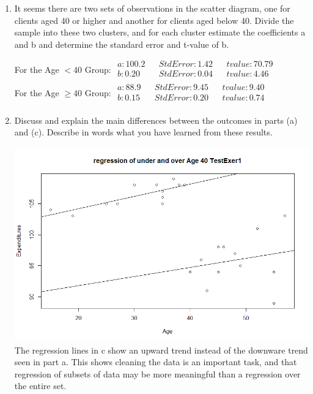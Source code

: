 \documentclass{article}
\begin{document}
\begin{enumerate}
\begin{enumerate}
		\item It seems there are two sets of observations in the scatter diagram, one for clients aged 40 or higher and
another for clients aged below 40. Divide the sample into these two clusters, and for each cluster estimate the
coefficients a and b and determine the standard error and t-value of b. \\
		\begin{center}
			For the Age $< 40$ Group:
			$\begin{matrix}
			a: 100.2 && Std Error: 1.42 && tvalue: 70.79 \\
			b: 0.20 && Std Error: 0.04 && tvalue: 4.46  \\
			\end{matrix}$
			\\
			For the Age $\geq 40$ Group:
			$\begin{matrix}
			a: 88.9 && Std Error: 9.45 && tvalue: 9.40 \\
			b: 0.15 && Std Error: 0.20 && tvalue: 0.74  \\
			\end{matrix}$
			\\
		\end{center}

		\item Discuss and explain the main differences between the outcomes in parts (a) and (c). Describe in words what
you have learned from these results. \\

		\begin{center}
			\includegraphics[scale=0.5]{splitRplot.png}		\\	
			The regression lines in c show an upward trend instead of the downware trend seen in part a. This shows cleaning the data is an important task, and that regression of subsets of data may be more meaningful than a regression over the entire set. \\
		\end{center}
	\end{enumerate}		
		

\end{enumerate}
\end{document}

